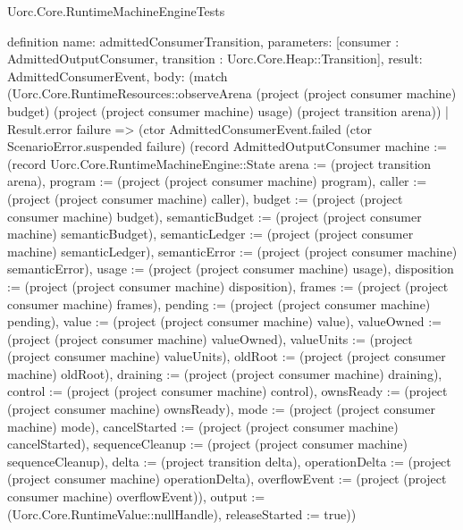 \begin{lexlean}{Uorc.Core.RuntimeMachineEngineTests}
\begin{semanticmodule}
definition{
  name: admittedConsumerTransition,
  parameters: [consumer : AdmittedOutputConsumer, transition : Uorc.Core.Heap::Transition],
  result: AdmittedConsumerEvent,
  body: (match (Uorc.Core.RuntimeResources::observeArena (project (project consumer machine) budget) (project (project consumer machine) usage) (project transition arena))
    | Result.error failure => (ctor AdmittedConsumerEvent.failed (ctor ScenarioError.suspended failure) (record AdmittedOutputConsumer {machine := (record Uorc.Core.RuntimeMachineEngine::State {arena := (project transition arena), program := (project (project consumer machine) program), caller := (project (project consumer machine) caller), budget := (project (project consumer machine) budget), semanticBudget := (project (project consumer machine) semanticBudget), semanticLedger := (project (project consumer machine) semanticLedger), semanticError := (project (project consumer machine) semanticError), usage := (project (project consumer machine) usage), disposition := (project (project consumer machine) disposition), frames := (project (project consumer machine) frames), pending := (project (project consumer machine) pending), value := (project (project consumer machine) value), valueOwned := (project (project consumer machine) valueOwned), valueUnits := (project (project consumer machine) valueUnits), oldRoot := (project (project consumer machine) oldRoot), draining := (project (project consumer machine) draining), control := (project (project consumer machine) control), ownsReady := (project (project consumer machine) ownsReady), mode := (project (project consumer machine) mode), cancelStarted := (project (project consumer machine) cancelStarted), sequenceCleanup := (project (project consumer machine) sequenceCleanup), delta := (project transition delta), operationDelta := (project (project consumer machine) operationDelta), overflowEvent := (project (project consumer machine) overflowEvent)}), output := (Uorc.Core.RuntimeValue::nullHandle), releaseStarted := true}))
}
\end{semanticmodule}
\end{lexlean}
